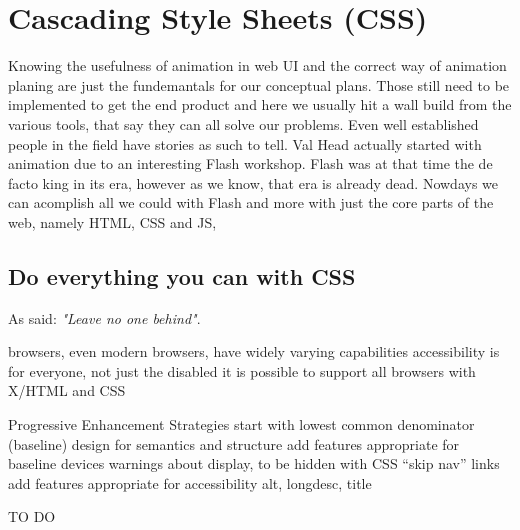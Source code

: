 %
%
% 
% 
% 


\chapter{Cascading Style Sheets (CSS)}

\label{chap:CSS}

Knowing the usefulness of animation in web UI and the correct way of animation planing are just the fundemantals for our conceptual plans. Those still need to be implemented to get the end product and here we usually hit a wall build from the various tools, that say they can all solve our problems. Even well established people in the field have stories as such to tell. Val Head actually started with animation due to an interesting Flash workshop. Flash was at that time the de facto king in its era, however as we know, that era is already dead. Nowdays we can acomplish
all we could with Flash and more with just the core parts of the web, namely HTML, CSS and JS, 

\section{Do everything you can with CSS}

As \citet{champeon2003inclusive}
 said: {\em"Leave no one behind"}.

browsers, even modern browsers, have widely varying capabilities
accessibility is for everyone, not just the disabled
it is possible to support all browsers with X/HTML and CSS


Progressive Enhancement Strategies
start with lowest common denominator (baseline)
design for semantics and structure
add features appropriate for baseline devices
warnings about display, to be hidden with CSS
“skip nav” links
add features appropriate for accessibility
alt, longdesc, title

\citet{champeon2003inclusive}



TO DO

\citet{w3school}
\citep{w3school}


\citet{vtldesign}
\citep{vtldesign}

\citet{head2016designing}
\citep{head2016designing}